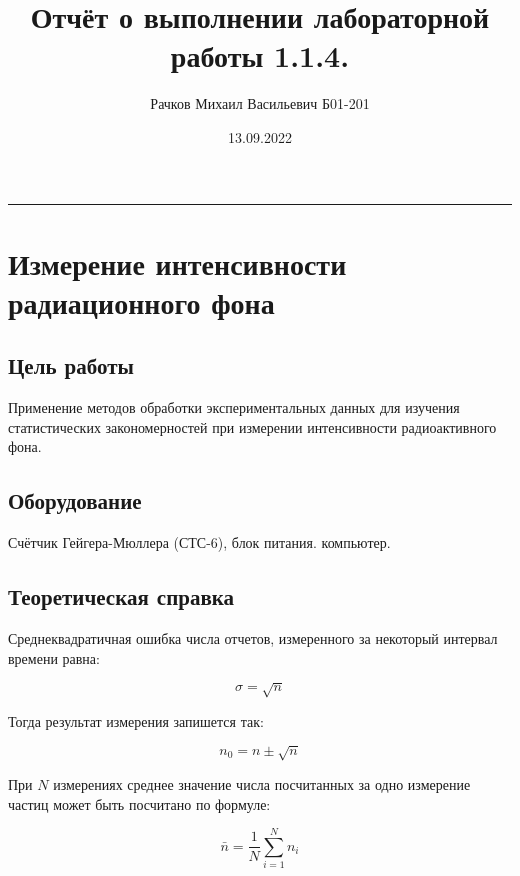 \documentclass[a4paper, 12pt]{article}
\begin{document}
\title{\textbf{Отчёт о выполнении лабораторной работы 1.1.4.}}
\author{Рачков Михаил Васильевич Б01-201}
\date{13.09.2022}
\maketitle
\begin{center}
\rule{135mm}{1pt}
\end{center}

\section*{Измерение интенсивности \\ радиационного фона}

\subsection*{Цель работы}
Применение методов обработки экспериментальных данных для изучения статистических закономерностей при измерении интенсивности радиоактивного фона.

\subsection*{Оборудование}
Счётчик Гейгера-Мюллера (СТС-6), блок питания. компьютер.

\subsection*{Теоретическая справка}

Среднеквадратичная ошибка числа отчетов, измеренного за некоторый интервал времени равна:

\begin{equation} \label{eq:1}
    \sigma = \sqrt{n}
\end{equation}

Тогда результат измерения запишется так:

\begin{equation} \label{eq:2}
    n_0 = n \pm \sqrt{n}
\end{equation}

При $N$ измерениях среднее значение числа посчитанных за одно измерение частиц может быть посчитано по формуле:

\begin{equation} \label{eq:3}
    \bar{n} = \frac{1}{N} \sum_{i=1}^N {n_i}
\end{equation}
\end{document}
